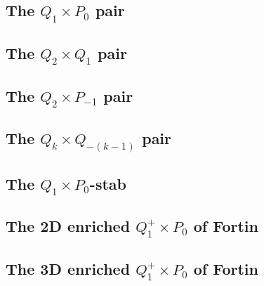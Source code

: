 
\subsection{The $Q_1\times P_0$ pair} \label{ss:pairq1p0}


\subsection{The $Q_2 \times Q_1$ pair} \label{ss:pairq2q1}


\subsection{The $Q_2 \times P_{-1}$ pair} \label{ss:pairq2pm1}


\subsection{The $Q_k \times Q_{-(k-1)}$ pair} \label{ss:pair_q2qm1}


\subsection{The $Q_1\times P_0$-stab} \label{ss:pairq1p0stab}


\subsection{The 2D enriched $Q_1^+\times P_0$ of Fortin} \label{ss:Q1pP02D}


\subsection{The 3D enriched $Q_1^+\times P_0$ of Fortin} \label{ss:Q1pP03D}


